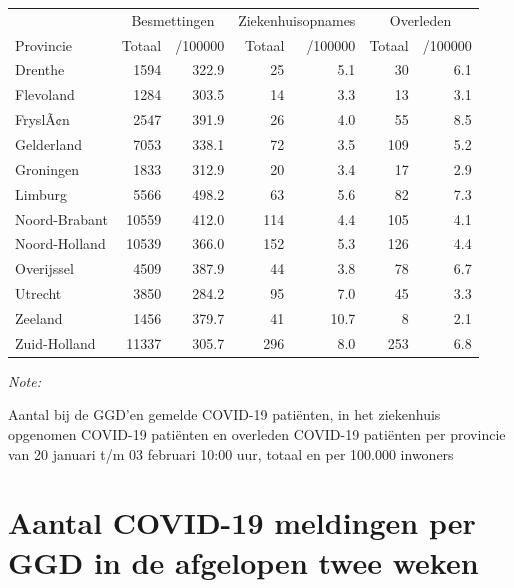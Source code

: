 \documentclass[
  english,
  man,floatsintext]{apa6}
\begin{document}
\begin{table}[H]
\centering
\begin{threeparttable}
\begin{tabular}{lrrrrrr}
\toprule
\multicolumn{1}{c}{ } & \multicolumn{2}{c}{Besmettingen} & \multicolumn{2}{c}{Ziekenhuisopnames} & \multicolumn{2}{c}{Overleden} \\
\cmidrule(l{3pt}r{3pt}){2-3} \cmidrule(l{3pt}r{3pt}){4-5} \cmidrule(l{3pt}r{3pt}){6-7}
Provincie & Totaal & /100000 & Totaal & /100000 & Totaal & /100000\\
\midrule
Drenthe & 1594 & 322.9 & 25 & 5.1 & 30 & 6.1\\
Flevoland & 1284 & 303.5 & 14 & 3.3 & 13 & 3.1\\
FryslÃ¢n & 2547 & 391.9 & 26 & 4.0 & 55 & 8.5\\
Gelderland & 7053 & 338.1 & 72 & 3.5 & 109 & 5.2\\
Groningen & 1833 & 312.9 & 20 & 3.4 & 17 & 2.9\\
Limburg & 5566 & 498.2 & 63 & 5.6 & 82 & 7.3\\
Noord-Brabant & 10559 & 412.0 & 114 & 4.4 & 105 & 4.1\\
Noord-Holland & 10539 & 366.0 & 152 & 5.3 & 126 & 4.4\\
Overijssel & 4509 & 387.9 & 44 & 3.8 & 78 & 6.7\\
Utrecht & 3850 & 284.2 & 95 & 7.0 & 45 & 3.3\\
Zeeland & 1456 & 379.7 & 41 & 10.7 & 8 & 2.1\\
Zuid-Holland & 11337 & 305.7 & 296 & 8.0 & 253 & 6.8\\
\bottomrule
\end{tabular}
\begin{tablenotes}
\item \textit{Note: } 
\item Aantal bij de GGD’en gemelde COVID-19 patiënten, in het ziekenhuis opgenomen COVID-19 patiënten en overleden COVID-19 patiënten per provincie van 20 januari t/m 03 februari 10:00 uur, totaal en per 100.000 inwoners
\end{tablenotes}
\end{threeparttable}
\end{table}

\newpage

\hypertarget{aantal-covid-19-meldingen-per-ggd-in-de-afgelopen-twee-weken}{%
\section{Aantal COVID-19 meldingen per GGD in de afgelopen twee weken}\label{aantal-covid-19-meldingen-per-ggd-in-de-afgelopen-twee-weken}}
\end{document}
